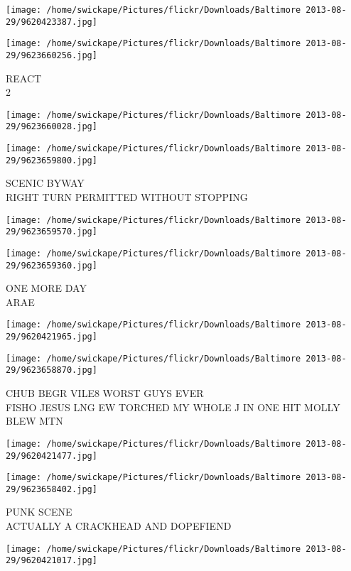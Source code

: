 \documentclass[10pt,letterpaper]{article}
\begin{document}
\texttt{[image: /home/swickape/Pictures/flickr/Downloads/Baltimore 2013-08-29/9620423387.jpg]}

\vspace{0.25in}
\texttt{[image: /home/swickape/Pictures/flickr/Downloads/Baltimore 2013-08-29/9623660256.jpg]}

REACT\\
2
\pagebreak

\texttt{[image: /home/swickape/Pictures/flickr/Downloads/Baltimore 2013-08-29/9623660028.jpg]}

\vspace{0.25in}
\texttt{[image: /home/swickape/Pictures/flickr/Downloads/Baltimore 2013-08-29/9623659800.jpg]}

SCENIC BYWAY\\
RIGHT TURN PERMITTED WITHOUT STOPPING
\pagebreak

\texttt{[image: /home/swickape/Pictures/flickr/Downloads/Baltimore 2013-08-29/9623659570.jpg]}

\vspace{0.25in}
\texttt{[image: /home/swickape/Pictures/flickr/Downloads/Baltimore 2013-08-29/9623659360.jpg]}

ONE MORE DAY\\
ARAE
\pagebreak

\texttt{[image: /home/swickape/Pictures/flickr/Downloads/Baltimore 2013-08-29/9620421965.jpg]}

\vspace{0.25in}
\texttt{[image: /home/swickape/Pictures/flickr/Downloads/Baltimore 2013-08-29/9623658870.jpg]}

CHUB BEGR VILE8 WORST GUYS EVER\\
FISHO JESUS LNG EW TORCHED MY WHOLE J IN ONE HIT MOLLY BLEW MTN
\pagebreak

\texttt{[image: /home/swickape/Pictures/flickr/Downloads/Baltimore 2013-08-29/9620421477.jpg]}

\vspace{0.25in}
\texttt{[image: /home/swickape/Pictures/flickr/Downloads/Baltimore 2013-08-29/9623658402.jpg]}

PUNK SCENE\\
ACTUALLY A CRACKHEAD AND DOPEFIEND
\pagebreak

\texttt{[image: /home/swickape/Pictures/flickr/Downloads/Baltimore 2013-08-29/9620421017.jpg]}
\end{document}
